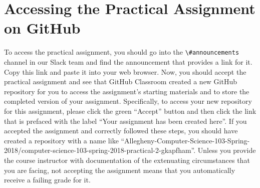 \documentclass[11pt]{article}
\newcommand{\url}[1]{\lstinline{#1}}
\newcommand{\channel}[1]{\lstinline{#1}}
\begin{document}



\section*{Accessing the Practical Assignment on GitHub}

To access the practical assignment, you should go into the \channel{\#announcements} channel in our Slack team and find
the announcement that provides a link for it. Copy this link and paste it into your web browser. Now, you should accept
the practical assignment and see that GitHub Classroom created a new GitHub repository for you to access the
assignment's starting materials and to store the completed version of your assignment. Specifically, to access your new
repository for this assignment, please click the green ``Accept'' button and then click the link that is prefaced with
the label ``Your assignment has been created here''. If you accepted the assignment and correctly followed these steps,
you should have created a repository with a name like
``Allegheny-Computer-Science-103-Spring-2018/computer-science-103-spring-2018-practical-2-gkapfham''. Unless you provide
the course instructor with documentation of the extenuating circumstances that you are facing, not accepting the
assignment means that you automatically receive a failing grade for it.
\end{document}
